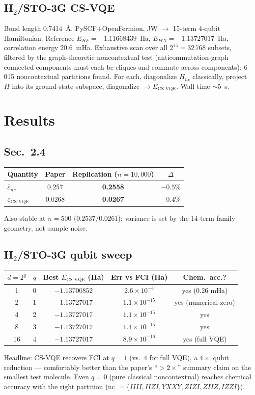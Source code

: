 \documentclass[11pt]{article}
\begin{document}
\subsection{H$_2$/STO-3G CS-VQE}
Bond length 0.7414~\AA, PySCF+OpenFermion, JW $\to$ 15-term 4-qubit
Hamiltonian. Reference $E_{HF}=-1.11668439$~Ha, $E_{FCI}=-1.13727017$~Ha,
correlation energy 20.6~mHa. Exhaustive scan over all $2^{15}=32\,768$
subsets, filtered by the graph-theoretic noncontextual test
(anticommutation-graph connected components must each be cliques and
commute across components); 6\,015 noncontextual partitions found. For
each, diagonalize $H_{nc}$ classically, project $H$ into its ground-state
subspace, diagonalize $\to E_{\text{CS-VQE}}$. Wall time $\sim 5$~s.

\section{Results}
\subsection{Sec.~2.4}
\begin{center}
\begin{tabular}{lccc}
\toprule
Quantity & Paper & Replication ($n{=}10{,}000$) & $\Delta$ \\
\midrule
$\overline{\varepsilon}_{nc}$        & 0.257  & \textbf{0.2558} & $-0.5\%$ \\
$\overline{\varepsilon}_{\text{CS-VQE}}$ & 0.0268 & \textbf{0.0267} & $-0.4\%$ \\
\bottomrule
\end{tabular}
\end{center}
Also stable at $n{=}500$ ($0.2537 / 0.0261$): variance is set by the
14-term family geometry, not sample noise.

\subsection{H$_2$/STO-3G qubit sweep}
\begin{center}
\begin{tabular}{ccccc}
\toprule
$d=2^q$ & $q$ & Best $E_{\text{CS-VQE}}$ (Ha) & Err vs FCI (Ha) & Chem.\ acc.? \\
\midrule
1  & 0 & $-1.13700852$ & $2.6\times 10^{-4}$ & yes (0.26 mHa) \\
2  & 1 & $-1.13727017$ & $1.1\times 10^{-15}$ & yes (numerical zero) \\
4  & 2 & $-1.13727017$ & $1.1\times 10^{-15}$ & yes \\
8  & 3 & $-1.13727017$ & $1.1\times 10^{-15}$ & yes \\
16 & 4 & $-1.13727017$ & $8.9\times 10^{-16}$ & yes (full VQE) \\
\bottomrule
\end{tabular}
\end{center}
Headline: CS-VQE recovers FCI at $q=1$ (vs.\ 4 for full VQE), a
$4\times$ qubit reduction --- comfortably better than the paper's
``$>\!2\times$'' summary claim on the smallest test molecule. Even $q=0$
(pure classical noncontextual) reaches chemical accuracy with the right
partition (nc $=\{IIII, IIZI, YXXY, ZIZI, ZIIZ, IZZI\}$).
\end{document}
